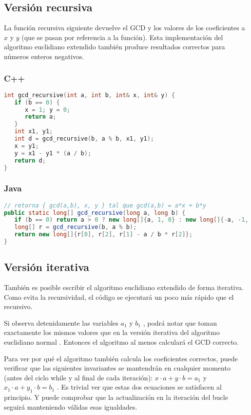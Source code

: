 \subsection{Versión recursiva}

La función recursiva siguiente devuelve el GCD y los valores de los coeficientes a $x$ y $y$ (que se pasan por referencia a la función). Esta implementación del algoritmo euclidiano extendido también produce resultados correctos para números enteros negativos.

\subsubsection{C++}
\begin{lstlisting}[language=C++]
int gcd_recursive(int a, int b, int& x, int& y) {
   if (b == 0) {
      x = 1; y = 0;
      return a;
   }
   int x1, y1;
   int d = gcd_recursive(b, a % b, x1, y1);
   x = y1;
   y = x1 - y1 * (a / b);
   return d;
}

\end{lstlisting}

\subsubsection{Java}
\begin{lstlisting}[language=Java]
// retorna { gcd(a,b), x, y } tal que gcd(a,b) = a*x + b*y
public static long[] gcd_recursive(long a, long b) {
   if (b == 0) return a > 0 ? new long[]{a, 1, 0} : new long[]{-a, -1, 0};
   long[] r = gcd_recursive(b, a % b);
   return new long[]{r[0], r[2], r[1] - a / b * r[2]};
}
\end{lstlisting}

\subsection{Versión iterativa}
También es posible escribir el algoritmo euclidiano extendido de forma iterativa. Como evita la recursividad, el código se ejecutará un poco más rápido que el recursivo.

Si observa detenidamente las variables $a_1$ y $b_1$ , podrá notar que toman exactamente los mismos valores que en la versión iterativa del algoritmo euclidiano normal . Entonces el algoritmo al menos calculará el GCD correcto.

Para ver por qué el algoritmo también calcula los coeficientes correctos, puede verificar que las siguientes invariantes se mantendrán en cualquier momento (antes del ciclo while y al final de cada iteración): $x \cdot a + y \cdot b = a_1$ y $x_1 \cdot a + y_1 \cdot b = b_1$ . Es trivial ver que estas dos ecuaciones se satisfacen al principio. Y puede comprobar que la actualización en la iteración del bucle seguirá manteniendo válidas esas igualdades.

